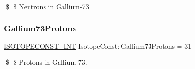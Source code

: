 \$ \$ Neutrons in Gallium-\/73. \mbox{\label{group___isotope_const-_gallium-_ga73_ga7d4b3cff4bc2603a0457499358517fd6}} 
\subsubsection{\texorpdfstring{Gallium73\+Protons}{Gallium73Protons}}
{\footnotesize\ttfamily \mbox{\hyperlink{group___isotope_const-_macros_ga5f18360b3e99483a35c32d789e62621c}{I\+S\+O\+T\+O\+P\+E\+C\+O\+N\+S\+T\+\_\+\+I\+NT}} Isotope\+Const\+::\+Gallium73\+Protons = 31}

\$ \$ Protons in Gallium-\/73. 